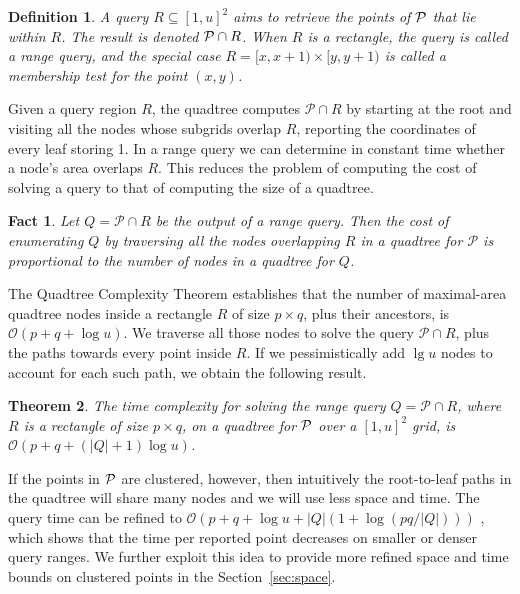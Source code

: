 \documentclass{elsarticle}
\newtheorem{theorem}{Theorem}
\newtheorem{fact}[theorem]{Fact}
\newtheorem{definition}{Definition}
\newcommand{\Oh}[1]
  {\ensuremath{\mathcal{O}\!\left( {#1} \right)}}
\begin{document}
\begin{definition}
A {\em query} $R \subseteq [1,u]^2$ aims to retrieve the points of $\cal P$
that lie within $R$. The result is denoted ${\cal P} \cap R$. When $R$ is a 
rectangle, the query is called a {\em range query}, and the special
case \(R = [x, x + 1) \times [y, y + 1)\) is called a {\em membership test}
for the point \((x, y)\).  
\end{definition}

Given a query region $R$, the quadtree computes \(\mathcal{P} \cap R\) by starting at the root and visiting all the nodes whose subgrids overlap $R$, reporting the coordinates of every leaf storing 1. In a range query we can determine in constant time whether a node's area overlaps $R$. This reduces the problem of computing the cost of solving a query to that of computing the size of a quadtree.

\begin{fact}
\label{fact:size}
Let $Q = \mathcal{P} \cap R$ be the output of a range query. Then the cost of enumerating $Q$ by traversing all the nodes overlapping $R$ in a quadtree for $\mathcal{P}$ is proportional to the number of nodes in a quadtree for $Q$.
\end{fact}

The Quadtree Complexity Theorem \cite{Kli71,HS79,Sam06} establishes that the number of maximal-area quadtree nodes inside a rectangle $R$ of size $p \times q$, plus their ancestors, is $\Oh{p+q+\log u}$. We traverse all those nodes to 
solve the query $\mathcal{P} \cap R$, plus the paths towards every point inside
$R$. If we pessimistically add $\lg u$ nodes to account for each such path, 
we obtain the following result.

\begin{theorem}
The time complexity for solving the range query $Q = \mathcal{P} \cap R$, 
where $R$ is a rectangle of size $p \times q$, on a quadtree for $\cal P$ over 
a $[1,u]^2$ grid, is $\Oh{p+q+(|Q|+1)\log u}$.
\end{theorem}

If the points in $\cal P$ are clustered, however, then intuitively the root-to-leaf paths in the quadtree will share many nodes and we will use less space and time. The query time can be refined to $\Oh{p+q+\log u+|Q|(1+\log(pq/|Q|))}$ \cite[p.~361]{Nav16}, which shows that the time per reported point decreases on smaller or denser query ranges.
We further exploit this idea to provide more refined space and time bounds on clustered points in the Section~\ref{sec:space}.
\end{document}
